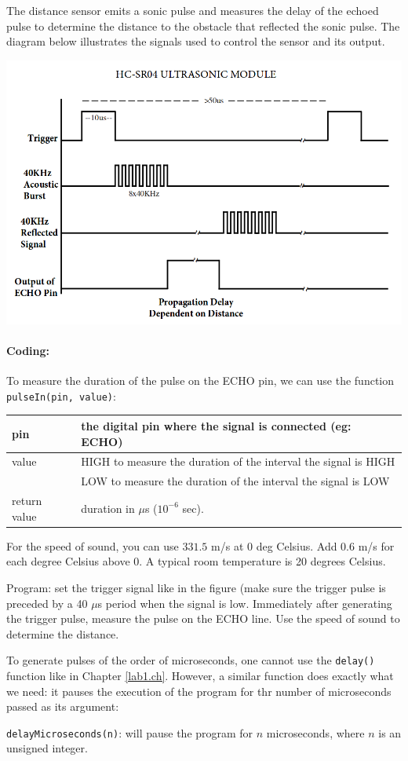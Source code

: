 \documentclass[12pt]{book}
\begin{document}
The distance sensor emits a sonic pulse and measures the delay of the
echoed pulse to determine the distance to the obstacle that reflected
the sonic pulse. The diagram below illustrates the signals used to
control the sensor and its output.

\includegraphics[width=.7\textwidth]{figs/8-hc-sr04-timing.png}

\paragraph{Coding:}

\begin{compactitem}[--]
\item To measure the duration of the pulse on the ECHO pin, we can use the
function \lstinline$pulseIn(pin, value)$:

\begin{tabular}{l | l}
  pin & the digital pin where the signal is connected (eg: ECHO) \\ \hline
  value & HIGH to measure the duration of the interval the signal is
  HIGH \\
  & LOW to measure the duration of the interval the signal is LOW
  \\ \hline
  return value & duration in $\mu$s ($10^{-6}$ sec). 
\end{tabular}

\item For the speed of sound, you can 
  use $331.5$ m/s at 0 deg Celsius. Add 0.6 m/s for each degree Celsius
  above 0. A typical room temperature is 20 degrees Celsius.

\item  Program: set the trigger signal like in the figure (make sure the
  trigger pulse is preceded by a 40 $\mu$s period when the signal is
  low. Immediately after generating the trigger pulse, measure the
  pulse on the ECHO line. Use the speed of sound to determine the
  distance.

\item  To generate pulses of the order of microseconds, one cannot use
  the \lstinline$delay()$ function like in Chapter
  \ref{lab1.ch}. However, a similar function does exactly what we
  need: it pauses the execution of the program for thr number of
  microseconds passed as its argument:

  \lstinline$delayMicroseconds(n)$: will pause the program for $n$
  microseconds, where $n$ is an unsigned integer.
\end{compactitem}
\end{document}
